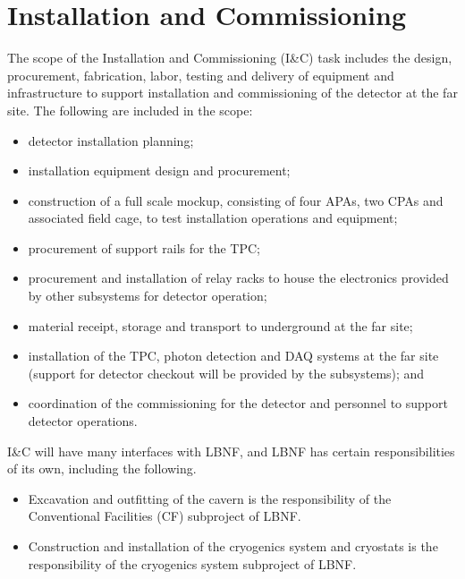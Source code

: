 \section{Installation and Commissioning}
\label{sec:detectors-fd-ref-install}

The scope of the Installation and Commissioning  (I\&C) task includes the
design, procurement, fabrication, labor, testing and delivery of
equipment and infrastructure to support installation and commissioning
of the detector at the far site. The following are included in the
scope:
\begin{itemize}
\item detector installation planning;
\item installation equipment design and procurement;
\item construction of a full scale mockup, consisting of four APAs, two CPAs and associated
  field cage, to test installation operations and
  equipment;
\item procurement of support rails for the TPC;
\item procurement and installation of relay racks to house the
  electronics provided by other subsystems for detector operation;
\item material receipt, storage and transport to underground at the far site;
\item installation of the TPC, photon detection and DAQ systems at the
  far site (support for detector checkout will be provided by the
  subsystems); and
\item coordination of the commissioning for the detector and personnel
  to support detector operations.
\end{itemize}

I\&C will have many interfaces with LBNF, and LBNF
has certain responsibilities of its own, including the following.
\begin{itemize}
\item Excavation and outfitting of the cavern is the responsibility of
  the Conventional Facilities (CF) subproject of LBNF.
\item Construction and installation of the cryogenics system and
  cryostats is the responsibility of the cryogenics system subproject
  of LBNF.
\end{itemize}

